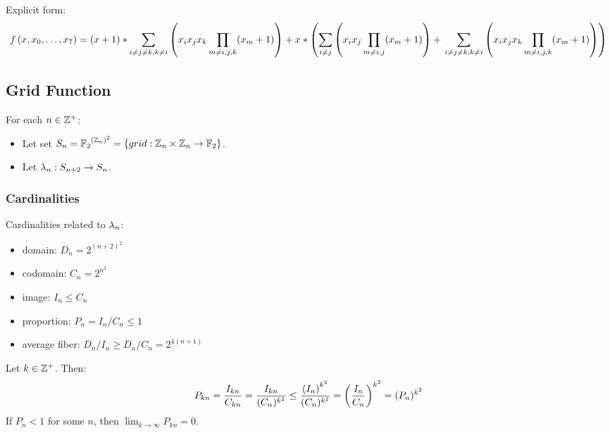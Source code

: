 \documentclass[letterpaper, 14pt]{extarticle}
\begin{document}
\begin{flushleft}
\begin{remark}
Explicit form:
\begin{dmath*}
\lp = (\cell + 1) *
\sum_{i \ne j \ne k, k \ne i}\parentheses
{\cell_i \cell_j \cell_k
\prod_{m \ne i, j, k}(\cell_m + 1)} + \\
\cell * \parentheses
{\sum_{i \ne j}\parentheses
{\cell_i \cell_j \prod_{m \ne i, j}(\cell_m + 1)} + \\
\sum_{i \ne j \ne k, k \ne i}\parentheses
{\cell_i \cell_j \cell_k
\prod_{m \ne i, j, k}(\cell_m + 1)}}
\end{dmath*}
\end{remark}


\subsection{Grid Function}

\begin{definition}
For each $n \in \mathbb{Z}^+$:
\begin{itemize}
\item Let set $S_{n} = {\mathbb{F}_2}^{{\left( \mathbb{Z}_n \right)}^2} =
  \{grid: \mathbb{Z}_n \times \mathbb{Z}_n \to \mathbb{F}_2\}$.
\item Let  $\lambda_{n}: S_{n+2} \to S_{n}$.
\end{itemize}
\end{definition}


\subsubsection{Cardinalities}

\begin{remark}
Cardinalities related to $\lambda_{n}$:
\begin{itemize}
\item domain: $D_n = 2^{(n+2)^2}$
\item codomain: $C_n = 2^{n^2}$
\item image: $I_n \le C_n$
\item proportion: $P_n = I_n / C_n \le 1$
\item average fiber: $D_n / I_n \ge D_n / C_n = 2^{4(n+1)}$
\end{itemize}
\end{remark}

\begin{remark}
Let $k \in \mathbb{Z}^+$. Then:
$$P_{k n} = \frac{I_{k n}}{C_{k n}}
= \frac{I_{k n}}{(C_n)^{k^2}}
\le \frac{{(I_n)}^{k^2}}{(C_n)^{k^2}}
= \left( \frac{I_n}{C_n} \right)^{k^2}
= (P_n)^{k^2}$$
If $P_n < 1$ for some $n$,
then $\lim_{k \to \infty} P_{kn} = 0$.
\end{remark}


\end{flushleft}
\end{document}
